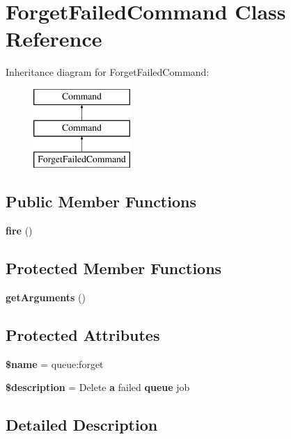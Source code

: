 \section{Forget\+Failed\+Command Class Reference}
\label{class_illuminate_1_1_queue_1_1_console_1_1_forget_failed_command}
Inheritance diagram for Forget\+Failed\+Command\+:\begin{figure}[H]
\begin{center}
\leavevmode
\includegraphics[height=3.000000cm]{class_illuminate_1_1_queue_1_1_console_1_1_forget_failed_command}
\end{center}
\end{figure}
\subsection*{Public Member Functions}
\begin{DoxyCompactItemize}
\item 
{\bf fire} ()
\end{DoxyCompactItemize}
\subsection*{Protected Member Functions}
\begin{DoxyCompactItemize}
\item 
{\bf get\+Arguments} ()
\end{DoxyCompactItemize}
\subsection*{Protected Attributes}
\begin{DoxyCompactItemize}
\item 
{\bf \$name} = \textquotesingle{}queue\+:forget\textquotesingle{}
\item 
{\bf \$description} = \textquotesingle{}Delete {\bf a} failed {\bf queue} job\textquotesingle{}
\end{DoxyCompactItemize}


\subsection{Detailed Description}


